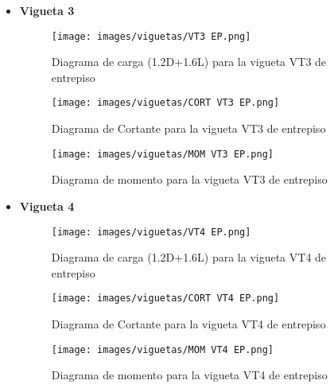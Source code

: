 \begin{itemize}
             \item \textbf{Vigueta 3}\\
            \begin{figure}[H]
                \centering
                \texttt{[image: images/viguetas/VT3 EP.png]} 
                \caption{Diagrama de carga (1.2D+1.6L) para la vigueta VT3 de entrepiso}
                \label{fig:W VT3 EP}
            \end{figure}
            
            \begin{figure}[H]
                \centering
                \texttt{[image: images/viguetas/CORT VT3 EP.png]} 
                \caption{Diagrama de Cortante para la vigueta VT3 de entrepiso}
                \label{fig:v VT3 EP}
            \end{figure}
            
             \begin{figure}[H]
                \centering
                \texttt{[image: images/viguetas/MOM VT3 EP.png]} 
                \caption{Diagrama de momento para la vigueta VT3 de entrepiso}
                \label{fig:M VT3 EP}
            \end{figure}
            
            \item \textbf{Vigueta 4}\\
            \begin{figure}[H]
                \centering
                \texttt{[image: images/viguetas/VT4 EP.png]}
                \caption{Diagrama de carga (1.2D+1.6L) para la vigueta VT4 de entrepiso}
                \label{fig:W VT4 EP}
            \end{figure}
            
            \begin{figure}[H]
                \centering
                \texttt{[image: images/viguetas/CORT VT4 EP.png]} 
                \caption{Diagrama de Cortante para la vigueta VT4 de entrepiso}
                \label{fig:v VT4 EP}
            \end{figure}
            
             \begin{figure}[H]
                \centering
                \texttt{[image: images/viguetas/MOM VT4 EP.png]} 
                \caption{Diagrama de momento para la vigueta VT4 de entrepiso}
                \label{fig:M VT4 EP}
            \end{figure}
            

\end{itemize}
